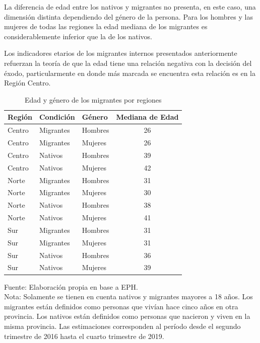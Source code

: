 \documentclass[12pt,a4paper]{article}
\begin{document}
La diferencia de edad entre los nativos y migrantes no presenta, en este caso, una dimensión distinta dependiendo del género de la persona. Para los hombres y las mujeres de todas las regiones la edad mediana de los migrantes es considerablemente inferior que la de los nativos. 

Los indicadores etarios de los migrantes internos presentados anteriormente refuerzan la teoría de que la edad tiene una relación negativa con la decisión del éxodo, particularmente en donde más marcada se encuentra esta relación es en la Región Centro.

\begin{table}[ht!]
\caption{Edad y género de los migrantes por regiones} 
\centering
\footnotesize
\begin{tabular}{lllc}
  \hline
  \hline
Región & Condición & Género & Mediana de Edad \\ 
  \hline
  \hline
 Centro & Migrantes & Hombres & 26 \\ 
 Centro & Migrantes & Mujeres & 26 \\ 
 Centro & Nativos & Hombres & 39 \\ 
 Centro & Nativos & Mujeres & 42 \\ 
 Norte & Migrantes & Hombres & 31\\ 
 Norte & Migrantes & Mujeres & 30 \\ 
 Norte & Nativos & Hombres & 38 \\ 
 Norte & Nativos & Mujeres & 41 \\ 
 Sur & Migrantes & Hombres & 31 \\ 
 Sur & Migrantes & Mujeres & 31 \\ 
 Sur & Nativos & Hombres & 36\\ 
 Sur & Nativos & Mujeres & 39 \\ 
   \hline
\end{tabular}
\label{cuadro:edad_mig}
\begin{flushleft}
\begin{scriptsize}
Fuente: Elaboración propia en base a EPH.\\
Nota: Solamente se tienen en cuenta nativos y migrantes mayores a 18 años. Los migrantes están definidos como personas que vivían hace cinco años en otra provincia. Los nativos están definidos como personas que nacieron y viven en la misma provincia. Las estimaciones corresponden al período desde el segundo trimestre de 2016 hasta el cuarto trimestre de 2019.
\end{scriptsize}
\end{flushleft}
\end{table}
\end{document}
